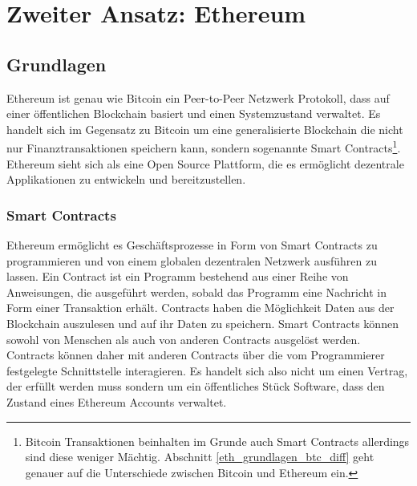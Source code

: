 \chapter{Zweiter Ansatz: Ethereum} %

\label{eth} %

\section{Grundlagen}
Ethereum ist genau wie Bitcoin ein Peer-to-Peer Netzwerk Protokoll, dass auf einer öffentlichen Blockchain basiert und einen Systemzustand verwaltet. Es handelt sich im Gegensatz zu Bitcoin um eine generalisierte Blockchain die nicht nur Finanztransaktionen speichern kann, sondern sogenannte Smart Contracts\footnote{Bitcoin Transaktionen beinhalten im Grunde auch Smart Contracts allerdings sind diese weniger Mächtig. Abschnitt \ref{eth_grundlagen_btc_diff} geht genauer auf die Unterschiede zwischen Bitcoin und Ethereum ein.}. Ethereum sieht sich als eine Open Source Plattform, die es ermöglicht dezentrale Applikationen zu entwickeln und bereitzustellen.

\subsection{Smart Contracts}
Ethereum ermöglicht es Geschäftsprozesse in Form von Smart Contracts zu programmieren und von einem globalen dezentralen Netzwerk ausführen zu lassen. Ein Contract ist ein Programm bestehend aus einer Reihe von Anweisungen, die ausgeführt werden, sobald das Programm eine Nachricht in Form einer Transaktion erhält. Contracts haben die Möglichkeit Daten aus der Blockchain auszulesen und auf ihr Daten zu speichern. Smart Contracts können sowohl von Menschen als auch von anderen Contracts ausgelöst werden. Contracts können daher mit anderen Contracts über die vom Programmierer festgelegte Schnittstelle interagieren. Es handelt sich also nicht um einen Vertrag, der erfüllt werden muss sondern um ein öffentliches Stück Software, dass den Zustand eines Ethereum Accounts verwaltet.
